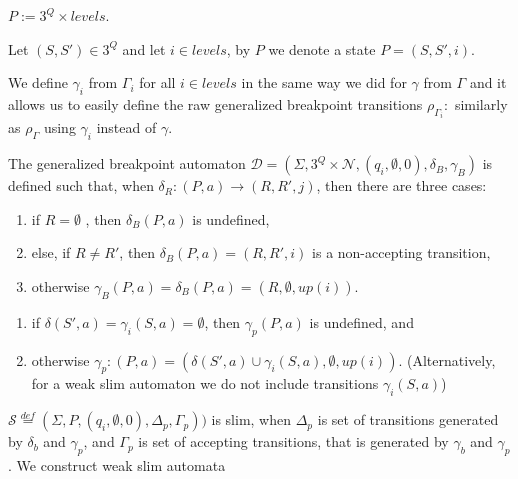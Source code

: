 \documentclass[
	digital
nolof, nolot
]{fithesis3}
\newcommand{\cD}{\mathcal{D}}
\newcommand{\cN}{\mathcal{N}}
\newcommand{\cS}{\mathcal{S}}
\newcommand{\eqdef}{\overset{def}{=}}
\begin{document}
			$P := 3^Q \times levels$.
			
			Let $(S,S')\in 3^Q$ and let $i \in levels$, by $P$ we denote a state $P=(S,S',i)$.
			
			We define $\gamma_i$ from $\Gamma_i$ for all $i \in levels$ in the same way we did for $\gamma$ from $\Gamma$ and it allows us to easily define the raw generalized breakpoint transitions
			$\rho_{\Gamma_{i}}\colon$ similarly as $\rho_\Gamma$ using $\gamma_i$ instead of $\gamma$.
			
			
			
			The generalized breakpoint automaton $\cD=(\Sigma, 3^Q\times\cN, ({q_i},\emptyset, 0),\delta_B,\gamma_B)$ is defined such that, when $\delta_R\colon(P, a) \rightarrow (R, R', j)$, then there are three cases:
			
			
			
			\begin{enumerate}
				\item if $R=\emptyset$ , then $\delta_B(P,a)$ is undefined,
				\item else, if $R \neq R'$, then $\delta_B(P,a) = (R,R',i)$ is a non-accepting transition,
				\item otherwise $\gamma_B(P, a) = \delta_B(P,a) = (R, \emptyset, up(i))$.
			\end{enumerate}
		
		
			\begin{enumerate}
				\item if $\delta(S',a)=\gamma_{i}(S, a)=\emptyset$, then $ \gamma_{p}(P,a)$ is undefined, and
				\item otherwise $\gamma_p \colon (P,a) = (\delta(S',a)\cup \gamma_{i}(S, a), \emptyset, up(i))$. (Alternatively, for a weak slim automaton we do not include transitions $\gamma_{i}(S, a)$)
			\end{enumerate}
			$\cS\eqdef(\Sigma, P, (q_i,\emptyset,0), \Delta_p,\Gamma_p))$ is slim, when $\Delta_p$ is set of transitions generated by $\delta_b$ and $\gamma_p$, and $\Gamma_p$ is set of accepting transitions, that is generated by $\gamma_b$ and $\gamma_p$. We construct weak slim automata 
			
\end{document}
